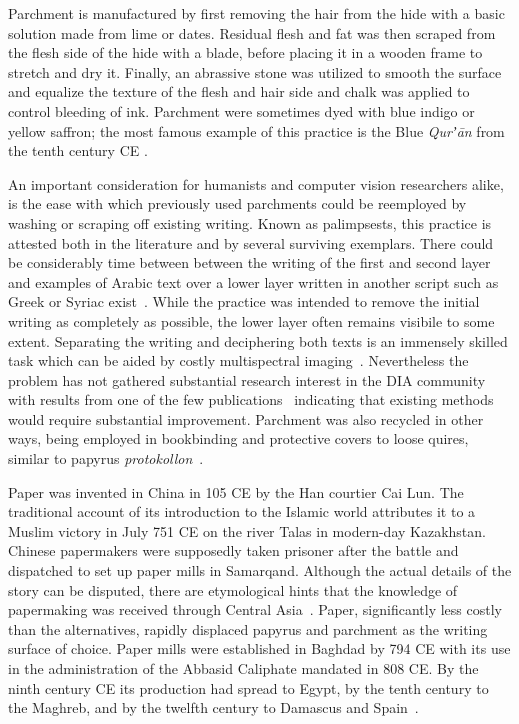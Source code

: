 Parchment is manufactured by first removing the hair from the hide with a basic
solution made from lime or dates. Residual flesh and fat was then scraped from
the flesh side of the hide with a blade, before placing it in a wooden frame to
stretch and dry it. Finally, an abrassive stone was utilized to smooth the
surface and equalize the texture of the flesh and hair side and chalk was
applied to control bleeding of ink. Parchment were sometimes dyed with blue
indigo or yellow saffron; the most famous example of this practice is the Blue
\emph{Qurʼān} from the tenth century CE \cite[pg. 195-196]{gacek2009arabic}.

An important consideration for humanists and computer vision researchers alike,
is the ease with which previously used parchments could be reemployed by
washing or scraping off existing writing. Known as palimpsests, this practice
is attested both in the literature and by several surviving exemplars. There
could be considerably time between between the writing of the first and second
layer and examples of Arabic text over a lower layer written in another script
such as Greek or Syriac exist~\cite[pg. 43-46]{deroche2006islamic}. While the
practice was intended to remove the initial writing as completely as possible,
the lower layer often remains visibile to some extent. Separating the writing
and deciphering both texts is an immensely skilled task which can be aided by
costly multispectral imaging~\cite{easton2003multispectral}. Nevertheless the
problem has not gathered substantial research interest in the DIA community
with results from one of the few publications~\cite{starynska2017methods}
indicating that existing methods would require substantial improvement.
Parchment was also recycled in other ways, being employed in bookbinding and
protective covers to loose quires, similar to papyrus \emph{protokollon}~\cite[pg. 46]{deroche2006islamic}.

Paper was invented in China in 105 CE by the Han courtier Cai Lun. The
traditional account of its introduction to the Islamic world attributes it to a
Muslim victory in July 751 CE on the river Talas in modern-day Kazakhstan.
Chinese papermakers were supposedly taken prisoner after the battle and
dispatched to set up paper mills in Samarqand. Although the actual details of
the story can be disputed, there are etymological hints that the knowledge of
papermaking was received through Central Asia~\cite[pg. 45]{blair2006islamic}.
Paper, significantly less costly than the alternatives, rapidly displaced
papyrus and parchment as the writing surface of choice. Paper mills were
established in Baghdad by 794 CE with its use in the administration of the
Abbasid Caliphate mandated in 808 CE. By the ninth century CE its production
had spread to Egypt, by the tenth century to the Maghreb, and by the twelfth
century to Damascus and Spain~\cite[pg. 51]{deroche2006islamic}.

